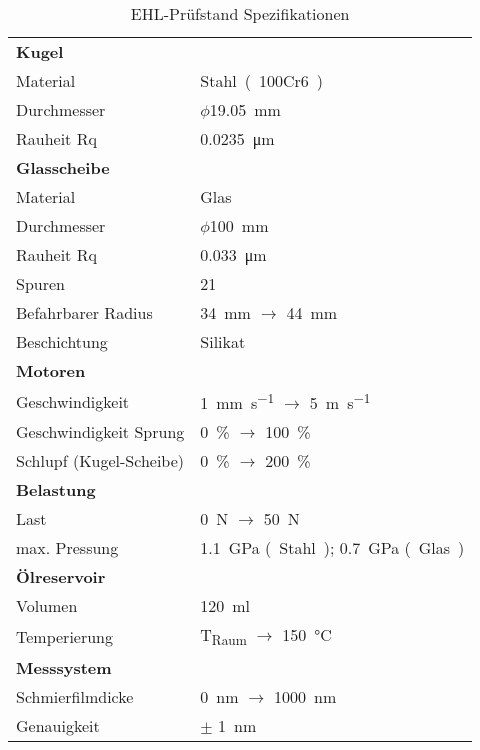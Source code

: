 \begin{table}[htb]
    \centering
    \caption{EHL-Prüfstand Spezifikationen \cite{ehl}}
    \begin{tabular}{m{5cm}l}
        \multicolumn{2}{l}{\textbf{Kugel}} \\
        Material & \si{Stahl~(100Cr6)} \\
        Durchmesser & $\phi$\SI{19.05}{\milli\meter} \\
        Rauheit Rq & \SI{0.0235}{\micro\meter} \\

        \hline

        \multicolumn{2}{l}{\textbf{Glasscheibe}} \\
        Material & \si{Glas} \\
        Durchmesser & $\phi$\SI{100}{\milli\meter} \\
        Rauheit Rq & \SI{0.033}{\micro\meter} \\
        Spuren & \num{21} \\
        Befahrbarer Radius & \SI{34}{\milli\meter} $\rightarrow$ \SI{44}{\milli\meter} \\
        Beschichtung & \si{Silikat} \\

        \hline

        \multicolumn{2}{l}{\textbf{Motoren}} \\
        Geschwindigkeit & \SI[per-mode=symbol]{1}{\milli\meter\per\second} $\rightarrow$ \SI[per-mode=symbol]{5}{\meter\per\second} \\
        Geschwindigkeit Sprung & \SI{0}{\percent} $\rightarrow$ \SI{100}{\percent} \\
        Schlupf (Kugel-Scheibe) & \SI{0}{\percent} $\rightarrow$ \SI{200}{\percent} \\

        \hline

        \multicolumn{2}{l}{\textbf{Belastung}} \\
        Last & \SI{0}{\newton} $\rightarrow$ \SI{50}{\newton} \\
        max. Pressung & \SI{1.1}{\giga\pascal} \si{(Stahl)}; \SI{0.7}{\giga\pascal} \si{(Glas)} \\

        \hline

        \multicolumn{2}{l}{\textbf{Ölreservoir}} \\
        Volumen & \SI{120}{\milli\litre} \\
        Temperierung & \si{T_{Raum}} $\rightarrow$ \SI{150}{\degreeCelsius} \\

        \hline

        \multicolumn{2}{l}{\textbf{Messsystem}} \\
        Schmierfilmdicke & \SI{0}{\nano\meter} $\rightarrow$ \SI{1000}{\nano\meter} \\
        Genauigkeit & $\pm$ \SI{1}{\nano\meter} \\
    \end{tabular}
    \label{tab:ehl_specs}
\end{table}
